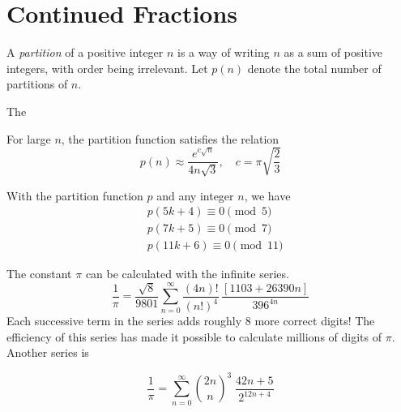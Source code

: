 \documentclass{article}
\newcounter{theorem}[section]
\newcounter{definition}[section]
\newcounter{example}[section]
\begin{document}
\section{Continued Fractions}
\begin{definition}
  \label{def:partition-of-an-integer}
A \textit{partition} of a positive integer $n$ is a way of writing $n$ as a sum of positive integers, with order being irrelevant. Let $p(n)$ denote the total number of partitions of $n$. 
\end{definition}

\begin{example}
  \label{ex:continued-fractions}
The 
\end{example}

\begin{theorem}
  \label{thm:hardy-ramanujan}
For large $n$, the partition function satisfies the relation
\begin{equation}
  p(n) \approx \frac{e^{c\sqrt{n}}}{4n \sqrt{3}}, \quad c = \pi \sqrt{\frac{2}{3}}
\end{equation}
\end{theorem}

\begin{theorem}[Ramanujan]
  \label{thm:ramanujan}
With the partition function $p$ and any integer $n$, we have
\begin{align}
    & p(5k+4) \equiv 0 \pmod{5} \\
    & p(7k+5) \equiv 0 \pmod{7} \\
    & p(11k+6) \equiv 0 \pmod{11}
\end{align}
\end{theorem}


\begin{theorem}[Ramanujan]
  \label{thm:ramanujan-2}
The constant $\pi$ can be calculated with the infinite series.
\begin{equation}
  \frac{1}{\pi} = \frac{\sqrt{8}}{9801} \sum_{n=0}^\infty \frac{(4n)!}{(n!)^4} \, \frac{[1103 + 26390n]}{396^{4n}}
\end{equation}
Each successive term in the series adds roughly 8 more correct digits! The efficiency of this series has made it possible to calculate millions of digits of $\pi$. Another series is 

\begin{equation}
  \frac{1}{\pi} = \sum_{n=0}^\infty \binom{2n}{n}^3 \; \frac{42n + 5}{2^{12n+4}}
\end{equation}
\end{theorem}
\end{document}
